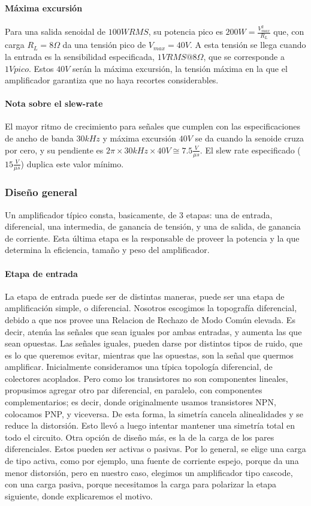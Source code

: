\documentclass[a4paper,12pt,twoside]{article}
\begin{document}
\paragraph{Máxima excursión} Para una salida senoidal de $100W RMS$, su potencia pico es $200W = \frac{V_{max}^2}{R_L}$ que, con carga $R_L=8\Omega$ da una tensión pico de $V_{max}=40V$. A esta tensión se llega cuando la entrada es la sensibilidad especificada, $1V RMS @8\Omega$, que se corresponde a $1V pico$. Estos $40V$ serán la máxima excursión, la tensión máxima en la que el amplificador garantiza que no haya recortes considerables.

\paragraph{Nota sobre el slew-rate} El mayor ritmo de crecimiento para señales que cumplen con las especificaciones de ancho de banda $30kHz$ y máxima excursión $40V$ se da cuando la senoide cruza por cero, y su pendiente es $2 \pi \times 30kHz\times 40V\cong 7.5\frac{V}{\mu s}$. El slew rate especificado ($15\frac{V}{\mu s}$) duplica este valor mínimo.


\subsubsection{Diseño general}

Un amplificador típico consta, basicamente, de 3 etapas: una de entrada, diferencial,  una intermedia, de ganancia de tensión, y una de salida, de ganancia de corriente. Esta última etapa es la responsable de proveer la potencia y la que determina la eficiencia, tamaño y peso del amplificador.


\paragraph{Etapa de entrada}
La etapa de entrada puede ser de distintas maneras, puede ser una etapa de amplificación simple, o diferencial. Nosotros escogimos la topografía diferencial, debido a que nos provee una Relacion de Rechazo de Modo Común elevada. Es decir, atenúa las señales que sean iguales  por ambas entradas, y aumenta las que sean opuestas. Las señales iguales, pueden darse por distintos tipos de ruido, que es lo que queremos evitar, mientras que las opuestas, son la señal que quermos amplificar. Inicialmente consideramos una típica topología diferencial, de colectores acoplados. Pero como los transistores no son componentes lineales, propusimos agregar otro par diferencial, en paralelo, con componentes complementarios; es decir, donde originalmente usamos transistores NPN, colocamos PNP, y viceversa. De esta forma, la simetría cancela alinealidades y se reduce la distorsión. Esto llevó a luego intentar mantener una simetría total en todo el circuito. Otra opción de diseño más, es la de la carga de los pares diferenciales. Estos pueden ser activas o pasivas. Por lo general, se elige una carga de tipo activa, como por ejemplo, una fuente de corriente espejo, porque da una menor distorsión, pero en nuestro caso, elegimos un amplificador tipo cascode, con una carga pasiva, porque necesitamos la carga para polarizar la etapa siguiente, donde explicaremos el motivo.
\end{document}
